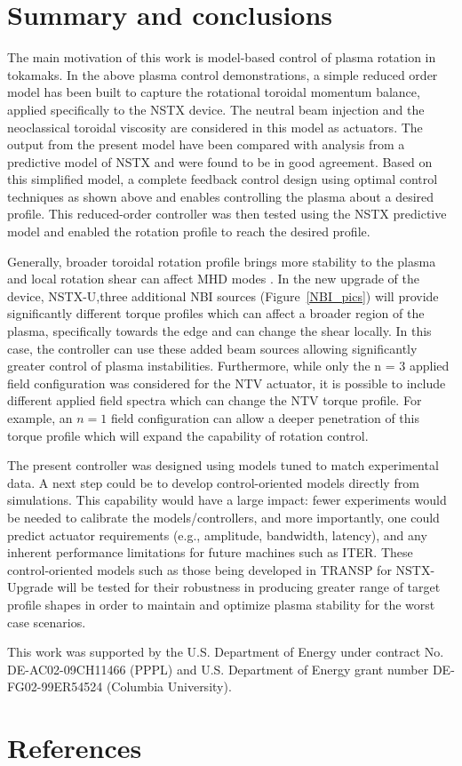 \documentclass[12pt]{iopart}
\begin{document}
\section{Summary and conclusions}
The main motivation of this work is model-based control of plasma rotation in tokamaks.
In the above plasma control demonstrations, a simple reduced order model has been built to capture the rotational toroidal momentum balance, applied specifically to the NSTX device. The neutral beam injection and the neoclassical toroidal viscosity are considered in this model as actuators. The output from the present model have been compared with analysis from a predictive model of NSTX and were found to be in good agreement.
Based on this simplified model, a complete feedback control design using optimal control techniques as shown above and enables controlling the plasma about a desired profile. This reduced-order controller was then tested using the NSTX predictive model and enabled the rotation profile to reach the desired profile.

Generally, broader toroidal rotation profile brings more stability to the plasma \cite{Sabbagh10} and local rotation shear can affect MHD modes  \cite{Gerhardt09}. In the new upgrade of the device, NSTX-U,three  additional NBI sources (Figure~{\ref{NBI_pics}}) will provide significantly different torque profiles which can affect a broader region of the plasma, specifically towards the edge and can change the shear locally. In this case, the controller can use these added beam sources allowing significantly greater control of plasma instabilities.
Furthermore, while only the n = 3 applied field configuration was considered for the NTV actuator, it is possible to include different applied field spectra which can change the NTV torque profile. For example, an $n=1$ field configuration can allow a deeper penetration of this torque profile which will expand the capability of rotation control.

The present controller was designed using models tuned to match experimental data. A next step could be to develop control-oriented models directly from simulations. This capability would have a large impact: fewer experiments would be needed to calibrate the models/controllers, and more importantly, one could predict actuator requirements (e.g., amplitude, bandwidth, latency), and any inherent performance limitations for future machines such as ITER.
These control-oriented models such as those being developed in TRANSP for NSTX-Upgrade will be tested for their robustness in producing greater range of target profile shapes in order to maintain and optimize plasma stability for the worst case scenarios. 

 
\ack 

This work was supported by the U.S. Department of Energy under contract No. DE-AC02-09CH11466 (PPPL) and U.S. Department of Energy  grant number DE-FG02-99ER54524 (Columbia University). 
\section*{References}



\end{document}
